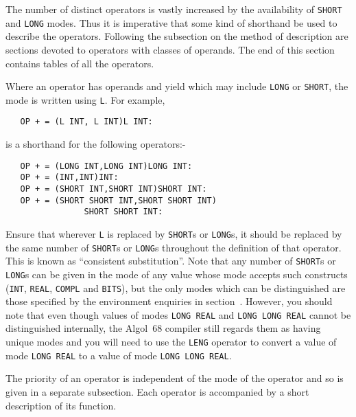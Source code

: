 The number of distinct operators is vastly increased by the
availability of \verb|SHORT| and \verb|LONG| modes. Thus it is
imperative that some kind of shorthand be used to describe the
operators. Following the subsection on the method of description are
sections devoted to operators with classes of operands. The end of this
section contains tables of all the operators.

Where an operator has operands and yield which may include \verb|LONG|
or \verb|SHORT|, the mode is written using \verb|L|. For example,
\begin{verbatim}
   OP + = (L INT, L INT)L INT:
\end{verbatim}
\noindent
is a shorthand for the following operators:-
\begin{verbatim}
   OP + = (LONG INT,LONG INT)LONG INT:
   OP + = (INT,INT)INT:
   OP + = (SHORT INT,SHORT INT)SHORT INT:
   OP + = (SHORT SHORT INT,SHORT SHORT INT)
                SHORT SHORT INT:
\end{verbatim}
\noindent
Ensure that wherever \verb|L| is replaced by \verb|SHORT|s or
\verb|LONG|s, it should be replaced by the same number of \verb|SHORT|s
or \verb|LONG|s throughout the definition of that operator. This is
known as ``consistent substitution''. Note that any number of
\verb|SHORT|s or \verb|LONG|s can be given in the mode of any value
whose mode accepts such constructs (\verb|INT|, \verb|REAL|,
\verb|COMPL| and \verb|BITS|), but the only modes which can be
distinguished are those specified by the environment enquiries in
section~. However, you should note that even though
values of modes \verb|LONG REAL| and \verb|LONG LONG REAL| cannot be
distinguished internally, the Algol~68 compiler still regards them as
having unique modes and you will need to use the \verb|LENG| operator
to convert a value of mode \verb|LONG REAL| to a value of mode
\verb|LONG LONG REAL|.

The priority of an operator is independent of the mode of the
operator and so is given in a separate subsection. Each operator is
accompanied by a short description of its function.

